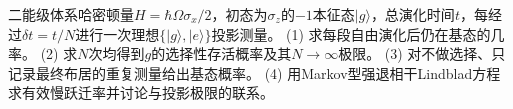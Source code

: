 二能级体系哈密顿量\(H=\hbar\Omega\sigma_x/2\)，初态为\(\sigma_z\)的\(-1\)本征态\(|g\rangle\)，总演化时间\(t\)，每经过\(\delta t=t/N\)进行一次理想\(\{|g\rangle,|e\rangle\}\)投影测量。
(1) 求每段自由演化后仍在基态的几率。
(2) 求\(N\)次均得到\(g\)的选择性存活概率及其\(N\to\infty\)极限。
(3) 对不做选择、只记录最终布居的重复测量给出基态概率。
(4) 用Markov型强退相干Lindblad方程求有效慢跃迁率并讨论与投影极限的联系。
